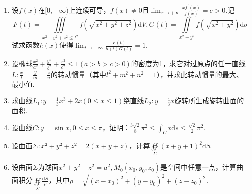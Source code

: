 \begin{enumerate}
	\item 设$f(x)$在$[0,+\infty)$上连续可导，$f(x)\ne 0$且$\lim _{x \rightarrow+\infty} \frac{x f^{\prime}(x)}{f(x)}=c>0$.记
	\[F(t)=\iiint\limits_{x^{2}+y^{2}+z^{2} \leqslant t^{2}} f\left(\sqrt{x^{2}+y^{2}+z^{2}}\right) \mathrm{d} V,G(t)=\iint\limits_{x^{2}+y^{2}} f\left(\sqrt{x^{2}+y^{2}}\right) \mathrm{d} \sigma\]
	试求函数$h(x)$使得$\lim _{t \rightarrow+\infty} \frac{F(t)}{h(t) G(t)}=1$.
	\begin{solution}
	\end{solution}
	
	\item 设椭球$\frac{x^{2}}{a^{2}}+\frac{y^{2}}{b^{2}}+\frac{z^{2}}{c^{2}} \leqslant 1(a>b>c>0)$的密度为1，求它对过原点的任一直线$L : \frac{x}{l}=\frac{y}{m}=\frac{z}{n}$的转动惯量（其中$l^{2}+m^{2}+n^{2}=1$），并求此转动惯量的最大、最小值.
	\begin{solution}
	\end{solution}
	
	\item 求曲线$L_{1} : y=\frac{1}{3} x^{3}+2 x(0 \leqslant x \leqslant 1)$绕直线$L_{2} : y=\frac{4}{3} x$旋转所生成旋转曲面的面积.
	\begin{solution}
	\end{solution}
	
	\item 设曲线$C : y=\sin x, 0 \leqslant x \leqslant \pi$，证明：$\frac{3 \sqrt{2}}{8} \pi^{2} \leqslant \int_{C} x \mathrm{d} s \leqslant \frac{\sqrt{2}}{2} \pi^{2}$.
	\begin{solution}
	\end{solution}
	
	\item 设曲面$\Sigma:x^{2}+y^{2}+z^{2}=2(x+y+z)$，计算$\oiint\limits_{\Sigma}(x+y+1)^{2} \mathrm{d} S$.
	\begin{solution}
	\end{solution}
	
	\item 设曲面$\Sigma$为球面$x^{2}+y^{2}+z^{2}=a^{2},  M_{0}\left(x_{0}, y_{0}, z_{0}\right)$是空间中任意一点，计算曲面积分$\oiint\limits_{\Sigma} \frac{\mathrm{d} S}{\rho}$，其中$\rho=\sqrt{\left(x-x_{0}\right)^{2}+\left(y-y_{0}\right)^{2}+\left(z-z_{0}\right)^{2}}$.
	\begin{solution}
	\end{solution}
	
\end{enumerate}